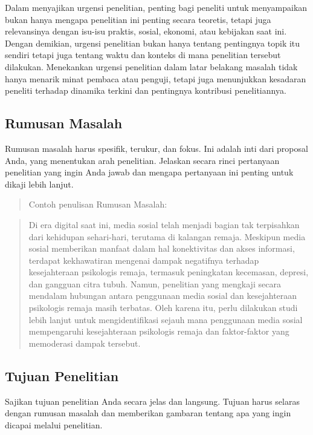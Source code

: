 \documentclass[
  indonesian,
  letterpaper,
]{scrbook}
\begin{document}
Dalam menyajikan urgensi penelitian, penting bagi peneliti untuk
menyampaikan bukan hanya mengapa penelitian ini penting secara teoretis,
tetapi juga relevansinya dengan isu-isu praktis, sosial, ekonomi, atau
kebijakan saat ini. Dengan demikian, urgensi penelitian bukan hanya
tentang pentingnya topik itu sendiri tetapi juga tentang waktu dan
konteks di mana penelitian tersebut dilakukan. Menekankan urgensi
penelitian dalam latar belakang masalah tidak hanya menarik minat
pembaca atau penguji, tetapi juga menunjukkan kesadaran peneliti
terhadap dinamika terkini dan pentingnya kontribusi penelitiannya.

\subsection{Rumusan Masalah}\label{rumusan-masalah}

Rumusan masalah harus spesifik, terukur, dan fokus. Ini adalah inti dari
proposal Anda, yang menentukan arah penelitian. Jelaskan secara rinci
pertanyaan penelitian yang ingin Anda jawab dan mengapa pertanyaan ini
penting untuk dikaji lebih lanjut.

\begin{quote}
Contoh penulisan Rumusan Masalah:
\end{quote}

\begin{quote}
Di era digital saat ini, media sosial telah menjadi bagian tak
terpisahkan dari kehidupan sehari-hari, terutama di kalangan remaja.
Meskipun media sosial memberikan manfaat dalam hal konektivitas dan
akses informasi, terdapat kekhawatiran mengenai dampak negatifnya
terhadap kesejahteraan psikologis remaja, termasuk peningkatan
kecemasan, depresi, dan gangguan citra tubuh. Namun, penelitian yang
mengkaji secara mendalam hubungan antara penggunaan media sosial dan
kesejahteraan psikologis remaja masih terbatas. Oleh karena itu, perlu
dilakukan studi lebih lanjut untuk mengidentifikasi sejauh mana
penggunaan media sosial mempengaruhi kesejahteraan psikologis remaja dan
faktor-faktor yang memoderasi dampak tersebut.
\end{quote}

\subsection{Tujuan Penelitian}\label{tujuan-penelitian}

Sajikan tujuan penelitian Anda secara jelas dan langsung. Tujuan harus
selaras dengan rumusan masalah dan memberikan gambaran tentang apa yang
ingin dicapai melalui penelitian.
\end{document}
